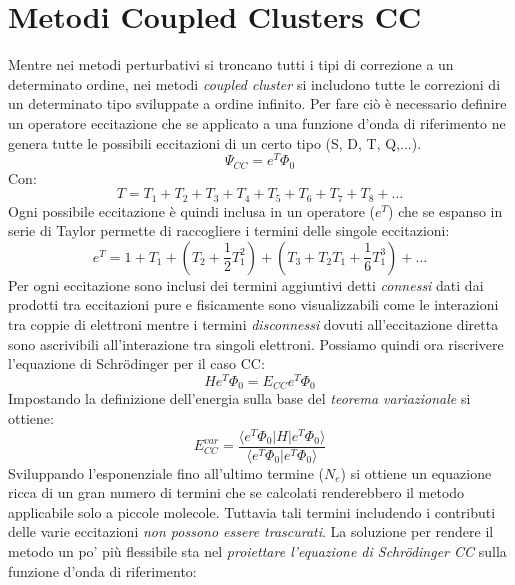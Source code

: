 \documentclass[oneside]{amsbook}
\numberwithin{section}{chapter}
\numberwithin{equation}{section}
\numberwithin{figure}{section}
\begin{document}
\section{Metodi Coupled Clusters CC }
Mentre nei metodi perturbativi si troncano tutti i tipi di correzione a un determinato ordine, nei metodi \emph{coupled cluster} si includono tutte le correzioni di un determinato tipo sviluppate a ordine infinito.
Per fare ciò è necessario definire un operatore eccitazione che  se applicato a una funzione d'onda di riferimento ne genera tutte le possibili eccitazioni di un certo tipo (S, D, T, Q,...).
\begin{equation}
\Psi_{CC}=e^{T}\Phi_0
\end{equation}
Con:
\begin{equation}
T= T_1+T_2+T_3+T_4+T_5+T_6+T_7+T_8+\ldots
\end{equation}
Ogni possibile eccitazione  è quindi inclusa in un operatore ($e^{T}$) che se espanso in serie di Taylor permette di raccogliere i termini delle singole eccitazioni:
\begin{equation}
e^T=1+T_1+(T_2+\frac{1}{2}T_1^2)+(T_3+T_2T_1+\frac{1}{6}T_1^3)+\ldots
\end{equation}
Per ogni eccitazione sono inclusi dei termini aggiuntivi detti \emph{connessi} dati dai prodotti tra eccitazioni pure e fisicamente sono visualizzabili come le interazioni tra coppie di elettroni mentre i termini \emph{disconnessi} dovuti all'eccitazione diretta sono ascrivibili all'interazione tra singoli elettroni. 
Possiamo quindi ora riscrivere l'equazione di Schr\"odinger per il caso CC:
\begin{equation}
H e^T \Phi_0= E_{CC} e^T\Phi_0
\end{equation}
Impostando la definizione dell'energia sulla base del \emph{teorema variazionale} si ottiene:
\begin{equation}
E^{var}_{CC}= \frac{\langle e^T\Phi_0 \vert H \vert e^T\Phi_0 \rangle }{\langle e^T\Phi_0\vert e^T\Phi_0 \rangle}
\end{equation}
Sviluppando l'esponenziale fino all'ultimo termine ($N_e$) si ottiene un equazione ricca di un gran numero di termini che se calcolati renderebbero il metodo applicabile solo a piccole molecole. Tuttavia tali termini includendo i contributi delle varie eccitazioni \emph{non possono essere trascurati}. La soluzione per rendere il metodo un po' più flessibile sta nel \emph{proiettare l'equazione di Schr\"odinger CC } sulla funzione d'onda di riferimento:
\end{document}
